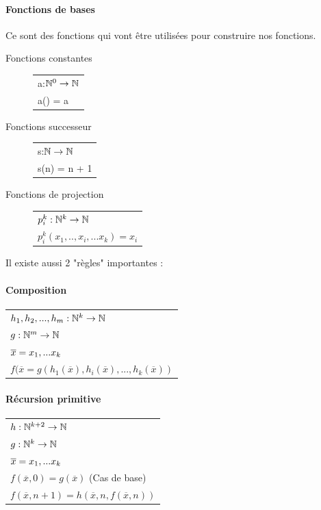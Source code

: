 \paragraph{Fonctions de bases} Ce sont des fonctions qui vont être utilisées 
pour construire nos fonctions.

\begin{description}
	\item[Fonctions constantes] 
		\begin{tabular}{|l|}
			\hline
			a:$\mathbb{N}^0 \rightarrow \mathbb{N}$\\
			a() = a\\
			\hline
		\end{tabular}
	\item[Fonctions successeur] 
		\begin{tabular}{|l|}
			\hline
			s:$\mathbb{N} \rightarrow \mathbb{N}$\\
			s(n) = n + 1\\
			\hline
		\end{tabular}
	\item[Fonctions de projection] 
		\begin{tabular}{|l|}
			\hline
			$p^k_i: \mathbb{N}^k \rightarrow \mathbb{N}$\\
			$p^k_i(x_1,..,x_i,...x_k) = x_i$\\
			\hline
		\end{tabular}
\end{description}

Il existe aussi 2 "règles" importantes :
\paragraph{Composition}
\begin{tabular}{|l|}
	\hline
	$h_1, h_2,...,h_m: \mathbb{N}^k \rightarrow \mathbb{N}$\\
	$g: \mathbb{N}^m \rightarrow \mathbb{N}$\\
	$\overline{x} =x_1,...x_k$ \\
	$f(\overline{x} = 
	g(h_1(\overline{x}),h_i(\overline{x}),...,h_k(\overline{x}))$\\
	\hline
\end{tabular}

\paragraph{Récursion primitive}
\begin{tabular}{|l|}
	\hline
	$h: \mathbb{N}^{k+2} \rightarrow \mathbb{N}$\\
	$g: \mathbb{N}^k \rightarrow \mathbb{N}$\\
	$\overline{x} =x_1,...x_k$ \\
	$f(\overline{x}, 0) = g(\overline{x})$ (Cas de base)\\
	$f(\overline{x}, n+1) = 
	h(\overline{x},n, f(\overline{x}, n))$\\
	\hline
\end{tabular}

